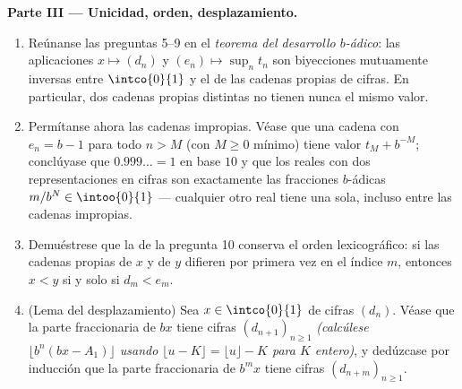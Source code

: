 \begin{problem}
\medskip
\noindent\textbf{Parte III --- Unicidad, orden, desplazamiento.}
\begin{enumerate}[resume]
  \item Reúnanse las preguntas 5--9 en el \emph{teorema del desarrollo
        $b$-ádico}: las aplicaciones $x \mapsto (d_n)$ y
        $(e_n) \mapsto \sup_n t_n$ son biyecciones mutuamente inversas
        entre $\intco{0}{1}$ y el  de las cadenas propias de
        cifras. En particular, dos cadenas propias distintas no tienen
        nunca el mismo valor.
  \item Permítanse ahora las cadenas impropias. Véase que una cadena
        con $e_n = b - 1$ para todo $n > M$ (con $M \geq 0$ mínimo)
        tiene valor $t_M + b^{-M}$; conclúyase que
        $0.999\dots = 1$ en base $10$ y que los reales con dos
        representaciones en cifras son exactamente las fracciones
        $b$-ádicas $m/b^N \in \intoo{0}{1}$ --- cualquier otro real
        tiene una sola, incluso entre las cadenas impropias.
  \item Demuéstrese que la  de la pregunta 10 conserva el
        orden lexicográfico: si las cadenas propias de $x$ y de $y$
        difieren por primera vez en el índice $m$, entonces $x < y$ si
        y solo si $d_m < e_m$.
  \item (Lema del desplazamiento) Sea $x \in \intco{0}{1}$ de cifras
        $(d_n)$. Véase que la parte fraccionaria de $bx$ tiene cifras
        $(d_{n+1})_{n \geq 1}$ \emph{(calcúlese
        $\lfloor b^n(bx - A_1)\rfloor$ usando $\lfloor u - K \rfloor =
        \lfloor u \rfloor - K$ para $K$ entero)}, y dedúzcase por
        inducción que la parte fraccionaria de $b^m x$ tiene cifras
        $(d_{n+m})_{n \geq 1}$.
\end{enumerate}


\end{problem}
